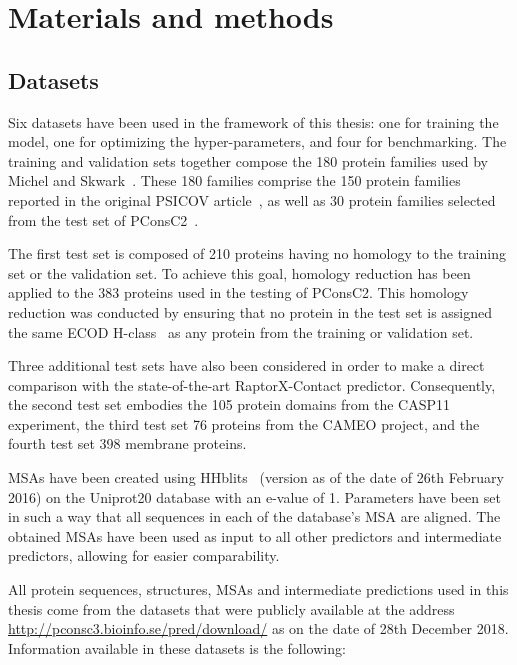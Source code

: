 \chapter{Materials and methods}

\section{Datasets}

  Six datasets have been used in the framework of this thesis:
  one for training the model, one for optimizing the hyper-parameters, and four for benchmarking.
  The training and validation sets together compose the 180 protein families used by Michel and Skwark~\cite{Skwark079673}.
  These 180 families comprise the 150 protein families reported in the original
  PSICOV article~\cite{doi:10.1093/bioinformatics/btr638}, as well as 30 protein families selected from the test set of
  PConsC2~\cite{10.1371/journal.pcbi.1003889}.

  The first test set is composed of 210 proteins having no homology to the training set or the validation set.
  To achieve this goal, homology reduction has been applied to the 383 proteins used in the testing of PConsC2.
  This homology reduction was conducted by ensuring that no protein in the test set is assigned the same
  ECOD H-class~\cite{10.1371/journal.pcbi.1003926} as any protein from the training or validation set.

  Three additional test sets have also been considered in order to make a direct comparison with the state-of-the-art RaptorX-Contact predictor.
  Consequently, the second test set embodies the 105 protein domains from the CASP11 experiment, the third test set 76 proteins from the CAMEO
  project, and the fourth test set 398 membrane proteins.

  MSAs have been created using HHblits~\cite{HHblits} (version as of the date of 26th February 2016) on the Uniprot20 database
  with an e-value of 1. Parameters have been set in such a way that all sequences in each of the database's MSA are aligned.
  The obtained MSAs have been used as input to all other predictors and intermediate predictors, allowing for easier comparability.

  All protein sequences, structures, MSAs and intermediate predictions used in this thesis come from the datasets that were publicly
  available at the address \url{http://pconsc3.bioinfo.se/pred/download/} as on the date of 28th December 2018.
  Information available in these datasets is the following:

